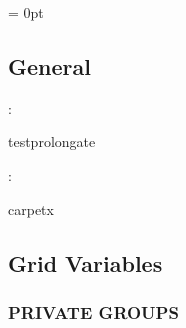 \parskip = 0pt

\vspace{3mm} \subsection*{General}

: 

testprolongate
\vspace{2mm}

: 

carpetx
\vspace{2mm}
\subsection*{Grid Variables}
\vspace{5mm}\subsubsection{PRIVATE GROUPS}

\vspace{5mm}

